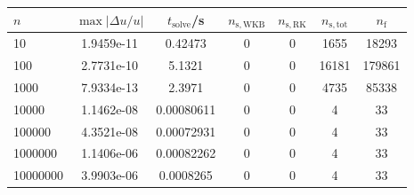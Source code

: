 \begin{tabular}{l c c c c c c}
\hline \hline 
$n$  &  $\max|\Delta u/u|$  &  $t_{\mathrm{solve}}$/\si{\s}  &  $n_{\mathrm{s,WKB}}$  &  $n_{\mathrm{s,RK}}$  &  $n_{\mathrm{s,tot}}$  &  $n_{\mathrm{f}}$ \\ \hline
10  &  1.9459e-11  &  0.42473  &  0  &  0  &  1655  &  18293  \\ 
100  &  2.7731e-10  &  5.1321  &  0  &  0  &  16181  &  179861  \\ 
1000  &  7.9334e-13  &  2.3971  &  0  &  0  &  4735  &  85338  \\ 
10000  &  1.1462e-08  &  0.00080611  &  0  &  0  &  4  &  33  \\ 
100000  &  4.3521e-08  &  0.00072931  &  0  &  0  &  4  &  33  \\ 
1000000  &  1.1406e-06  &  0.00082262  &  0  &  0  &  4  &  33  \\ 
10000000  &  3.9903e-06  &  0.0008265  &  0  &  0  &  4  &  33  \\ 
\end{tabular}
